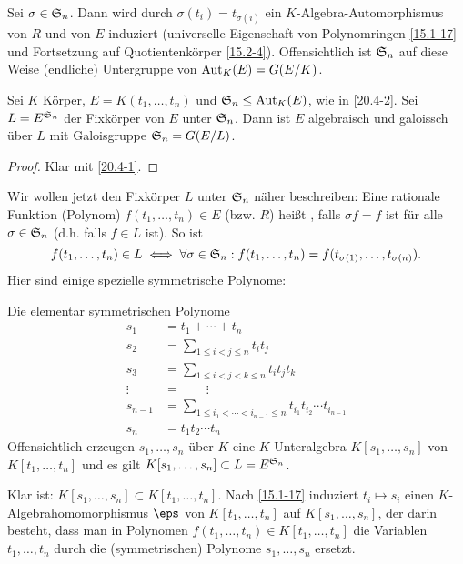 \begin{df} \label{20.4-2}
	Sei $\sigma \in \S_n$.
	Dann wird durch $\sigma(t_i) = t_{\sigma(i)}$ ein $K$-Algebra-Automorphismus von $R$ und von $E$ induziert (universelle Eigenschaft von Polynomringen \ref{15.1-17} und Fortsetzung auf Quotientenkörper \ref{15.2-4}).
	Offensichtlich ist $\S_n$ auf diese Weise (endliche) Untergruppe von $\Aut_K(E) = G(E / K)$.
\end{df}

\begin{st} \label{20.4-3}
	Sei $K$ Körper, $E = K(t_1, \dotsc, t_n)$ und $\S_n \le \Aut_K(E)$, wie in \ref{20.4-2}.
	Sei $L = E^{\S_n}$ der Fixkörper von $E$ unter $\S_n$.
	Dann ist $E$ algebraisch und galoissch über $L$ mit Galoisgruppe $\S_n = G(E / L)$.
	\begin{proof}
		Klar mit \ref{20.4-1}.
	\end{proof}
\end{st}

Wir wollen jetzt den Fixkörper $L$ unter $\S_n$ näher beschreiben:
Eine rationale Funktion (Polynom) $f(t_1, \dotsc, t_n) \in E$ (bzw. $R$) heißt , falls $\sigma f = f$ ist für alle $\sigma \in \S_n$ (d.h. falls $f \in L$ ist).
So ist
\[
	f(t_1, \dotsc, t_n) \in L
	\iff
	\forall \sigma \in \S_n : f(t_1, \dotsc, t_n) = f(t_{\sigma(1)}, \dotsc, t_{\sigma(n)}).
\]
Hier sind einige spezielle symmetrische Polynome:

\begin{ex} \label{20.4-4}
	Die elementar symmetrischen Polynome
	\begin{align*}
		s_1 &= t_1 + \dotsb + t_n \\
		s_2 &= \sum_{1 \le i < j \le n} t_i t_j  \\
		s_3 &= \sum_{1 \le i < j < k \le n} t_i t_j t_k \\
		\vdots\; &= \qquad \vdots \\
		s_{n-1} &= \sum_{1 \le i_1 < \dotsb < i_{n-1} \le n} t_{i_1} t_{i_2} \dotsb t_{i_{n-1}} \\
		s_n &= t_1 t_2 \dotsb t_n
	\end{align*}
	Offensichtlich erzeugen $s_1, \dotsc, s_n$ über $K$ eine $K$-Unteralgebra $K[s_1, \dotsc, s_n]$ von $K[t_1, \dotsc, t_n]$ und es gilt $K[s_1, \dotsc, s_n] \subset L = E^{\S_n}$.
\end{ex}

Klar ist: $K[s_1, \dotsc, s_n] \subset K[t_1, \dotsc, t_n]$.
Nach \ref{15.1-17} induziert $t_i \mapsto s_i$ einen $K$-Algebrahomomorphismus $\eps$ von $K[t_1, \dotsc, t_n]$ auf $K[s_1, \dotsc, s_n]$, der darin besteht, dass man in Polynomen $f(t_1, \dotsc, t_n) \in K[t_1, \dotsc, t_n]$ die Variablen $t_1, \dotsc, t_n$ durch die (symmetrischen) Polynome $s_1, \dotsc, s_n$ ersetzt.

